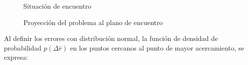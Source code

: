 \begin{figure}[!h]
\begin{minipage}[t]{0.48\textwidth}
 \centering
 \caption[El planteo general de la PoC]{Situaci\'on de encuentro  \citep{alfano2007review}}
 \label{fig:pocproblema}
\end{minipage}
\begin{minipage}[t]{0.48\textwidth}
 \centering
 \caption[El plano de encuentro]{Proyecci\'on del problema al plano de encuentro \citep{alfano2007review}}
 \label{fig:poc2d}
\end{minipage}
\end{figure}

Al definir los errores con distribuci\'on normal, la funci\'on de densidad de probabilidad $p(\Delta \bar{r})$ en los puntos cercanos al punto de mayor acercamiento, se expresa:

